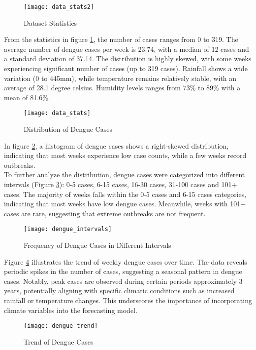 \begin{figure}[h!]
	\centering
	\texttt{[image: data\_stats2]}
	\caption{Dataset Statistics}
	\label{fig:data_stats2}
\end{figure}

From the statistics in figure \ref{fig:data_stats2}, the number of cases ranges from 0 to 319. The average number of dengue cases per week is 23.74, with a median of 12 cases and a standard deviation of 37.14. The distribution is highly skewed, with some weeks experiencing significant number of cases (up to 319 cases). Rainfall shows a wide variation (0 to 445mm), while temperature remains relatively stable, with an average of 28.1 degree celsius. Humidity levels ranges from 73\% to 89\% with a mean of 81.6\%.

\begin{figure}[ht]
	\centering
	\texttt{[image: data\_stats]}
	\caption{Distribution of Dengue Cases}
	\label{fig:data_stats}
\end{figure}

In figure \ref{fig:data_stats}, a histogram of dengue cases shows a right-skewed distribution, indicating that most weeks experience low case counts, while a few weeks record outbreaks. 
\\To further analyze the distribution, dengue cases were categorized into different intervals (Figure \ref{fig:dengue_intervals}): 0-5 cases, 6-15 cases, 16-30 cases, 31-100 cases and 101+ cases. The majority of weeks falls within the 0-5 cases and 6-15 cases categories, indicating that most weeks have low dengue cases. Meanwhile, weeks with 101+ cases are rare, suggesting that extreme outbreaks are not frequent.
\begin{figure}[ht]
	\centering
	\texttt{[image: dengue\_intervals]}
	\caption{Frequency of Dengue Cases in Different Intervals}
	\label{fig:dengue_intervals}
\end{figure}

Figure \ref{fig:data_trend} illustrates the trend of weekly dengue cases over time. The data reveals periodic spikes in the number of cases, suggesting a seasonal pattern in dengue cases. Notably, peak cases are observed during certain periods approximately 3 years, potentially aligning with specific climatic conditions such as increased rainfall or temperature changes. This underscores the importance of incorporating climate variables into the forecasting model.

\begin{figure}[ht]
	\centering
	\texttt{[image: dengue\_trend]}
	\caption{Trend of Dengue Cases}
	\label{fig:data_trend}
\end{figure}

